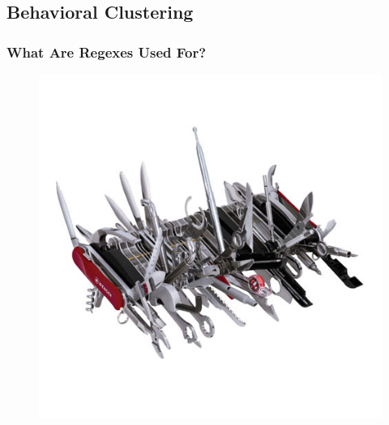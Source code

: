 \subsection{Behavioral Clustering}

\begin{frame}
\frametitle{What Are Regexes Used For?}
\begin{figure}[ht]
  \centering
  \includegraphics[scale=0.7]{nontex/illustrations/swissArmyMess.jpg}
  \label{fig:whatUsedFor}
\end{figure}
\end{frame}




